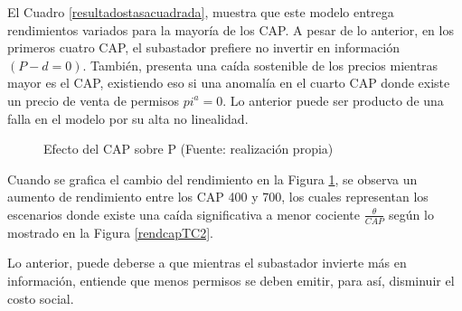 El Cuadro \ref{resultadostasacuadrada}, muestra que este modelo entrega rendimientos variados para la mayoría de los CAP. A pesar de lo anterior, en los primeros cuatro CAP, el subastador prefiere no invertir en información $(P-d=0)$. También, presenta una caída sostenible de los precios mientras mayor es el CAP, existiendo eso si una anomalía en el cuarto CAP donde existe un precio de venta de permisos $pi^a=0$. Lo anterior puede ser producto de una falla en el modelo por su alta no linealidad.
\vspace{2.5mm}

\begin{figure}[H]
\centering
{}
\caption{{\footnotesize Efecto del CAP sobre P (Fuente: realización propia)}}
\label{rendcapTC}
\end{figure}

Cuando se grafica el cambio del rendimiento en la Figura \ref{rendcapTC}, se observa un aumento de rendimiento entre los CAP 400 y 700, los cuales representan los escenarios donde existe una caída significativa a menor cociente $\frac{\theta}{CAP}$ según lo mostrado en la Figura \ref{rendcapTC2}.
\vspace{2.5mm}

Lo anterior, puede deberse a que mientras el subastador invierte más en información, entiende que menos permisos se deben emitir, para así, disminuir el costo social.
\vspace{2.5mm}

